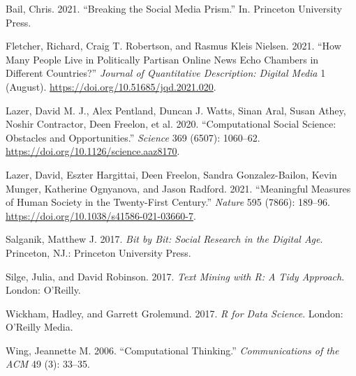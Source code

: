 \documentclass[
  letterpaper,
  DIV=11,
  numbers=noendperiod]{scrreprt}
\newlength{\cslhangindent}
\newlength{\cslentryspacingunit} %
\newenvironment{CSLReferences}[2] %
 {%
  \setlength{\parindent}{0pt}
  \ifodd #1
  \let\oldpar\par
  \def\par{\hangindent=\cslhangindent\oldpar}
  \fi
  \setlength{\parskip}{#2\cslentryspacingunit}
 }%
 {}
\begin{document}
\hypertarget{refs}{}
\begin{CSLReferences}{1}{0}
\leavevmode{}%
Bail, Chris. 2021. {``Breaking the Social Media Prism.''} In. Princeton
University Press.

\leavevmode{}%
Fletcher, Richard, Craig T. Robertson, and Rasmus Kleis Nielsen. 2021.
{``How Many People Live in Politically Partisan Online News Echo
Chambers in Different Countries?''} \emph{Journal of Quantitative
Description: Digital Media} 1 (August).
\url{https://doi.org/10.51685/jqd.2021.020}.

\leavevmode{}%
Lazer, David M. J., Alex Pentland, Duncan J. Watts, Sinan Aral, Susan
Athey, Noshir Contractor, Deen Freelon, et al. 2020. {``Computational
Social Science: {Obstacles} and Opportunities.''} \emph{Science} 369
(6507): 1060--62. \url{https://doi.org/10.1126/science.aaz8170}.

\leavevmode{}%
Lazer, David, Eszter Hargittai, Deen Freelon, Sandra Gonzalez-Bailon,
Kevin Munger, Katherine Ognyanova, and Jason Radford. 2021.
{``Meaningful Measures of Human Society in the Twenty-First Century.''}
\emph{Nature} 595 (7866): 189--96.
\url{https://doi.org/10.1038/s41586-021-03660-7}.

\leavevmode{}%
Salganik, Matthew J. 2017. \emph{Bit by {Bit}: {Social} {Research} in
the {Digital} {Age}}. Princeton, NJ.: Princeton University Press.

\leavevmode{}%
Silge, Julia, and David Robinson. 2017. \emph{Text {Mining} with {R}:
{A} {Tidy} {Approach}}. London: O'Reilly.

\leavevmode{}%
Wickham, Hadley, and Garrett Grolemund. 2017. \emph{R for {Data}
{Science}}. London: O'Reilly Media.

\leavevmode{}%
Wing, Jeannette M. 2006. {``Computational Thinking.''}
\emph{Communications of the ACM} 49 (3): 33--35.

\end{CSLReferences}
\end{document}
